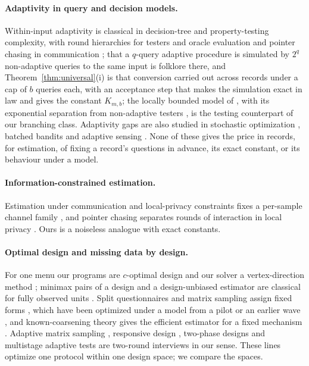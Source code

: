 \documentclass{article}
\begin{document}
\paragraph{Adaptivity in query and decision models.} Within-input adaptivity is classical in decision-tree and property-testing complexity, with round hierarchies for testers and oracle evaluation \citep{canonne2018,li2026regex} and pointer chasing in communication \citep{nisan1993}; that a $q$-query adaptive procedure is simulated by $2^q$ non-adaptive queries to the same input is folklore there, and Theorem~\ref{thm:universal}(i) is that conversion carried out across records under a cap of $b$ queries each, with an acceptance step that makes the simulation exact in law and gives the constant $K_{m,b}$; the locally bounded model of \citet{adar2024}, with its exponential separation from non-adaptive testers \citep{goldreich2022,chakraborty2023}, is the testing counterpart of our branching class. Adaptivity gaps are also studied in stochastic optimization \citep{dean2008,golovin2011}, batched bandits \citep{perchet2016,gao2019} and adaptive sensing \citep{ariascastro2013}. None of these gives the price in records, for estimation, of fixing a record's questions in advance, its exact constant, or its behaviour under a model.

\paragraph{Information-constrained estimation.} Estimation under communication and local-privacy constraints fixes a per-sample channel family \citep{acharya2019,barnes2020,acharya2022tit,lau2026}, and pointer chasing separates rounds of interaction in local privacy \citep{joseph2019,joseph2020}. Ours is a noiseless analogue with exact constants.

\paragraph{Optimal design and missing data by design.} For one menu our programs are $c$-optimal design and our solver a vertex-direction method \citep{elfving1952,fedorov1972,wynn1970,pukelsheim1993,sagnol2011}; minimax pairs of a design and a design-unbiased estimator are classical for fully observed units \citep{stenger1979,gabler1990,aronow2026}. Split questionnaires and matrix sampling assign fixed forms \citep{raghunathan1995,graham2006,thomas2006,chipperfield2009,rhemtulla2012}, which have been optimized under a model from a pilot or an earlier wave \citep{adiguzel2008,jang2022}, and known-coarsening theory gives the efficient estimator for a fixed mechanism \citep{robins1994,tsiatis2006}. Adaptive matrix sampling \citep{gonzalez2008}, responsive design \citep{groves2006}, two-phase designs \citep{reilly1995,gilbert2014,mcisaac2015,tao2020,chen2020,chen2022} and multistage adaptive tests \citep{yamamoto2018,fink2024} are two-round interviews in our sense. These lines optimize one protocol within one design space; we compare the spaces.
\end{document}
